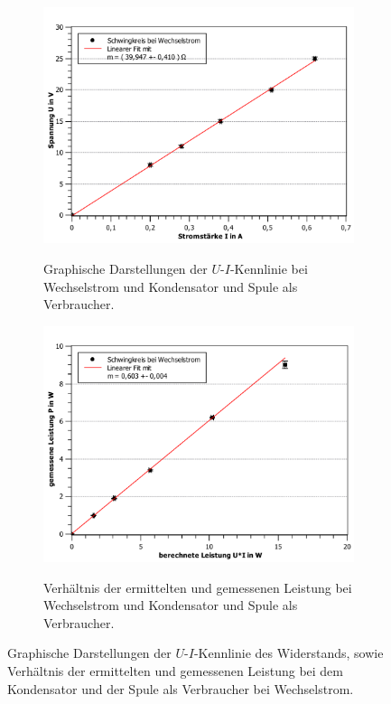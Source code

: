 \begin{figure}[ht]
	
	\centering	
	\begin{subfigure}{0.70\textwidth}
		\centering
		\includegraphics[width=\textwidth]{auswertung/kondensator-wechsel-Widerstand.pdf}
		\label{fig:9}
		\caption{Graphische Darstellungen der $U$-$I$-Kennlinie bei Wechselstrom und Kondensator und Spule als Verbraucher.}	
	\end{subfigure}
	\begin{subfigure}{0.70\textwidth}
		\centering
		\includegraphics[width=\textwidth]{auswertung/kondensator-wechsel-Leistung.pdf}
		\label{fig:10}
		\caption{Verhältnis der ermittelten und gemessenen Leistung bei Wechselstrom und Kondensator und Spule als Verbraucher.}	
	\end{subfigure}
	\caption{Graphische Darstellungen der $U$-$I$-Kennlinie des Widerstands, sowie Verhältnis der ermittelten und gemessenen Leistung bei dem Kondensator und der Spule als Verbraucher bei Wechselstrom.}
	\label{fig:schwing_wechsel}
\end{figure}
